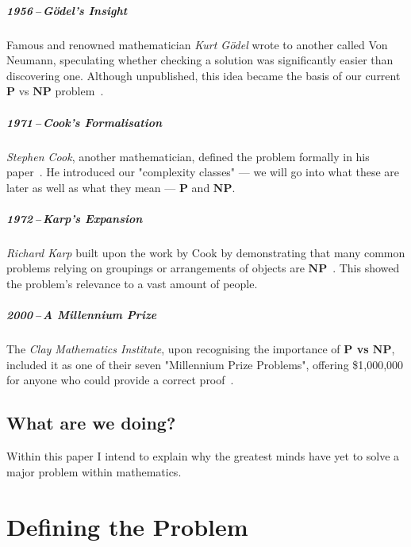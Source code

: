 \documentclass[12pt]{report}
\begin{document}
\paragraph{1956\,--\,Gödel's Insight}
Famous and renowned mathematician \textit{Kurt Gödel} wrote to another called Von Neumann, speculating whether checking a solution was significantly easier than discovering one.
Although unpublished, this idea became the basis of our current $\mathbf{P}$ vs $\mathbf{NP}$ problem~\cite{godel1956}.

\paragraph{1971\,--\,Cook's Formalisation}
\textit{Stephen Cook}, another mathematician, defined the problem formally in his paper~\cite{cook1971}.
He introduced our "complexity classes" --- we will go into what these are later as well as what they mean --- $\mathbf{P}$ and $\mathbf{NP}$.

\paragraph{1972\,--\,Karp's Expansion}
\textit{Richard Karp} built upon the work by Cook by demonstrating that many common problems relying on groupings or arrangements of objects are $\mathbf{NP}$~\cite{karp1972}.
This showed the problem's relevance to a vast amount of people.

\paragraph{2000\,--\,A Millennium Prize}
The \textit{Clay Mathematics Institute}, upon recognising the importance of \textbf{$\mathbf{P}$ vs $\mathbf{NP}$}, included it as one of their seven "Millennium Prize Problems", offering \$1,000,000 for anyone who could provide a correct proof~\cite{claymillennium}.

\section*{What are we doing?}
Within this paper I intend to explain why the greatest minds have yet to solve a major problem within mathematics.


\newpage
\chapter{Defining the Problem}
\end{document}
